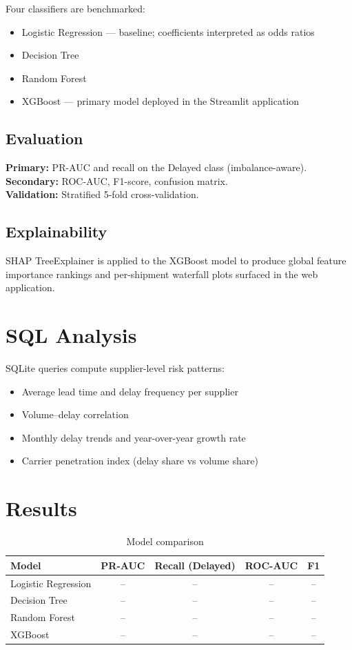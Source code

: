 \documentclass[runningheads]{llncs}
\begin{document}
Four classifiers are benchmarked:
\begin{itemize}
  \item Logistic Regression — baseline; coefficients interpreted as odds ratios
  \item Decision Tree
  \item Random Forest
  \item XGBoost — primary model deployed in the Streamlit application
\end{itemize}

\subsection{Evaluation}

\textbf{Primary:} PR-AUC and recall on the Delayed class (imbalance-aware).\\
\textbf{Secondary:} ROC-AUC, F1-score, confusion matrix.\\
\textbf{Validation:} Stratified 5-fold cross-validation.

\subsection{Explainability}

SHAP TreeExplainer is applied to the XGBoost model to produce global feature
importance rankings and per-shipment waterfall plots surfaced in the web
application.


\section{SQL Analysis}

SQLite queries compute supplier-level risk patterns:
\begin{itemize}
  \item Average lead time and delay frequency per supplier
  \item Volume--delay correlation
  \item Monthly delay trends and year-over-year growth rate
  \item Carrier penetration index (delay share vs volume share)
\end{itemize}


\section{Results}

\begin{table}[h]
\caption{Model comparison}\label{tab:results}
\begin{tabular}{lcccc}
\toprule
Model & PR-AUC & Recall (Delayed) & ROC-AUC & F1 \\
\midrule
Logistic Regression & -- & -- & -- & -- \\
Decision Tree       & -- & -- & -- & -- \\
Random Forest       & -- & -- & -- & -- \\
XGBoost             & -- & -- & -- & -- \\
\bottomrule
\end{tabular}
\end{table}
\end{document}
